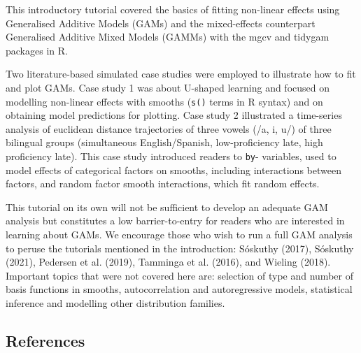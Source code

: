 \documentclass[
  letterpaper,
  DIV=11,
  numbers=noendperiod]{scrartcl}
\begin{document}
This introductory tutorial covered the basics of fitting non-linear
effects using Generalised Additive Models (GAMs) and the mixed-effects
counterpart Generalised Additive Mixed Models (GAMMs) with the mgcv and
tidygam packages in R.

Two literature-based simulated case studies were employed to illustrate
how to fit and plot GAMs. Case study 1 was about U-shaped learning and
focused on modelling non-linear effects with smooths (\texttt{s()} terms
in R syntax) and on obtaining model predictions for plotting. Case study
2 illustrated a time-series analysis of euclidean distance trajectories
of three vowels (/a, i, u/) of three bilingual groups (simultaneous
English/Spanish, low-proficiency late, high proficiency late). This case
study introduced readers to \texttt{by}- variables, used to model
effects of categorical factors on smooths, including interactions
between factors, and random factor smooth interactions, which fit random
effects.

This tutorial on its own will not be sufficient to develop an adequate
GAM analysis but constitutes a low barrier-to-entry for readers who are
interested in learning about GAMs. We encourage those who wish to run a
full GAM analysis to peruse the tutorials mentioned in the introduction:
Sóskuthy (2017), Sóskuthy (2021), Pedersen et al. (2019), Tamminga et
al. (2016), and Wieling (2018). Important topics that were not covered
here are: selection of type and number of basis functions in smooths,
autocorrelation and autoregressive models, statistical inference and
modelling other distribution families.

\newpage{}

\subsection*{References}\label{references}
\end{document}
